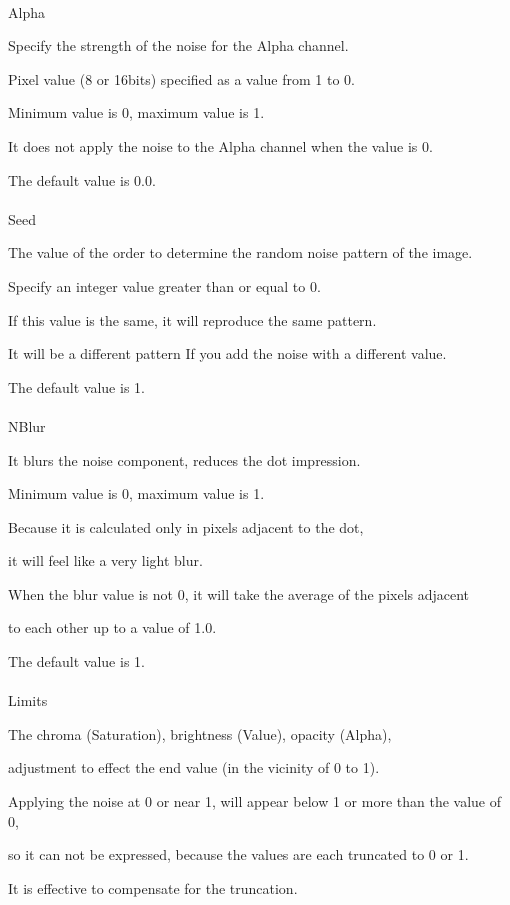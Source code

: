 \documentclass[a4paper,12pt]{article}
\begin{document}
\ \vspace{-0.2em}
\par
\noindent Alpha\par
Specify the strength of the noise for the Alpha channel.\par
Pixel value (8 or 16bits) specified as a value from 1 to 0.\par
Minimum value is 0, maximum value is 1.\par
It does not apply the noise to the Alpha channel when the value is 0.\par
The default value is 0.0.\\
\\
Seed\par
The value of the order to determine the random noise pattern of the image.\par
Specify an integer value greater than or equal to 0.\par
If this value is the same, it will reproduce the same pattern.\par
It will be a different pattern If you add the noise with a different value.\par
The default value is 1.\\
\\
NBlur\par
It blurs the noise component, reduces the dot  impression.\par
Minimum value is 0, maximum value is 1.\par
Because it is calculated only in pixels adjacent to the dot,\par
it will feel like a very light blur.\par
When the blur value is not 0, it will take the average of the pixels adjacent\par
to each other up to a value of 1.0.\par
The default value is 1.\\
\\
Limits\par
The chroma (Saturation), brightness (Value), opacity (Alpha),\par
adjustment to effect the end value (in the vicinity of 0 to 1).\par
Applying the noise at 0 or near 1, will appear below 1 or more than the value of 0,\par
so it can not be expressed, because the values are each truncated to 0 or 1.\par
It is effective to compensate for the truncation.\par
\end{document}
